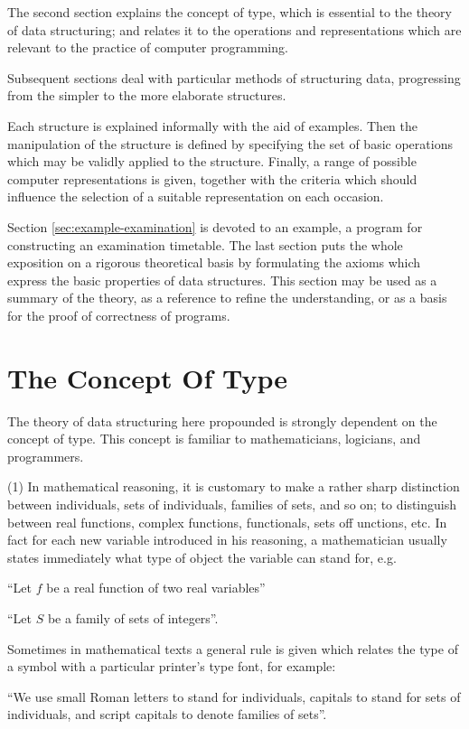 The second section explains the concept of type, which is essential to the theory of data structuring; and relates it to the operations and representations which are relevant to the practice of computer programming.

Subsequent sections deal with particular methods of structuring data, progressing from the simpler to the more elaborate structures.

Each structure is explained informally with the aid of examples. Then the manipulation of the structure is defined by specifying the set of basic operations which may be validly applied to the structure. Finally, a range of possible computer representations is given, together with the criteria which should influence the selection of a suitable representation on each occasion.

Section \ref{sec:example-examination} is devoted to an example, a program for constructing an examination timetable. The last section puts the whole exposition on a rigorous theoretical basis by formulating the axioms which express the basic properties of data structures. This section may be used as a summary of the theory, as a reference to refine the understanding, or as a basis for the proof of correctness of programs.

\section[The concept of type]{The Concept Of Type}

The theory of data structuring here propounded is strongly dependent on the concept of type. This concept is familiar to mathematicians, logicians, and programmers.

(1) In mathematical reasoning, it is customary to make a rather sharp distinction between individuals, sets of individuals, families of sets, and so on; to distinguish between real functions, complex functions, functionals, sets off unctions, etc. In fact for each new variable introduced in his reasoning, a mathematician usually states immediately what type of object the variable can stand for, e.g.

\quad ``Let $f$ be a real function of two real variables''

\quad ``Let $S$ be a family of sets of integers''.

Sometimes in mathematical texts a general rule is given which relates the type of a symbol with a particular printer's type font, for example:

\parindent \quad``We use small Roman letters to stand for individuals, capitals to stand for sets of individuals, and script capitals to denote families of sets''.


